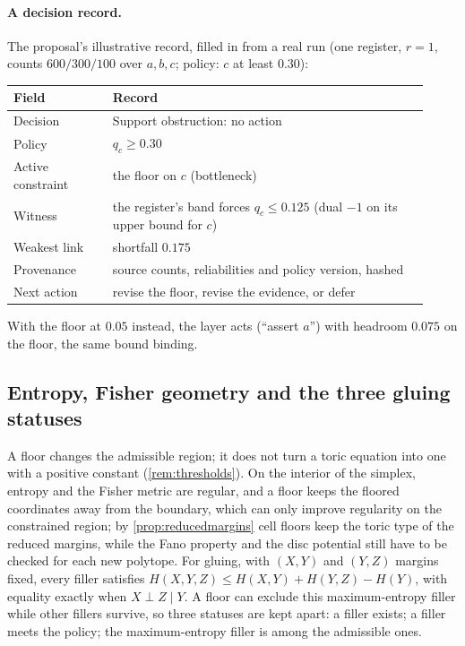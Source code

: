 \documentclass[11pt]{article}
\theoremstyle{definition}
\theoremstyle{remark}
\begin{document}
\paragraph{A decision record.} The proposal's illustrative record, filled in from a real run (one register, $r=1$, counts
$600/300/100$ over $a,b,c$; policy: $c$ at least $0.30$):
\begin{center}\small
\begin{tabular}{>{\raggedright\arraybackslash}p{0.22\linewidth}>{\raggedright\arraybackslash}p{0.7\linewidth}}
\toprule
Field & Record\\
\midrule
Decision & Support obstruction: no action\\
Policy & $q_c\ge0.30$\\
Active constraint & the floor on $c$ (bottleneck)\\
Witness & the register's band forces $q_c\le0.125$ (dual $-1$ on its upper bound for $c$)\\
Weakest link & shortfall $0.175$\\
Provenance & source counts, reliabilities and policy version, hashed\\
Next action & revise the floor, revise the evidence, or defer\\
\bottomrule
\end{tabular}
\end{center}
With the floor at $0.05$ instead, the layer acts (``assert $a$'') with headroom $0.075$ on the floor, the same bound binding.

\subsection{Entropy, Fisher geometry and the three gluing statuses}
A floor changes the admissible region; it does not turn a toric equation into one with a positive constant (\cref{rem:thresholds}).
On the interior of the simplex, entropy and the Fisher metric are regular, and a floor keeps the floored coordinates away from the
boundary, which can only improve regularity on the constrained region; by \cref{prop:reducedmargins} cell floors keep the toric
type of the reduced margins, while the Fano property and the disc potential still have to be checked for each new polytope. For
gluing, with $(X,Y)$ and $(Y,Z)$ margins fixed, every filler satisfies $H(X,Y,Z)\le H(X,Y)+H(Y,Z)-H(Y)$, with equality exactly when
$X\perp Z\mid Y$. A floor can exclude this maximum-entropy filler while other fillers survive, so three statuses are kept apart: a
filler exists; a filler meets the policy; the maximum-entropy filler is among the admissible ones.
\end{document}
